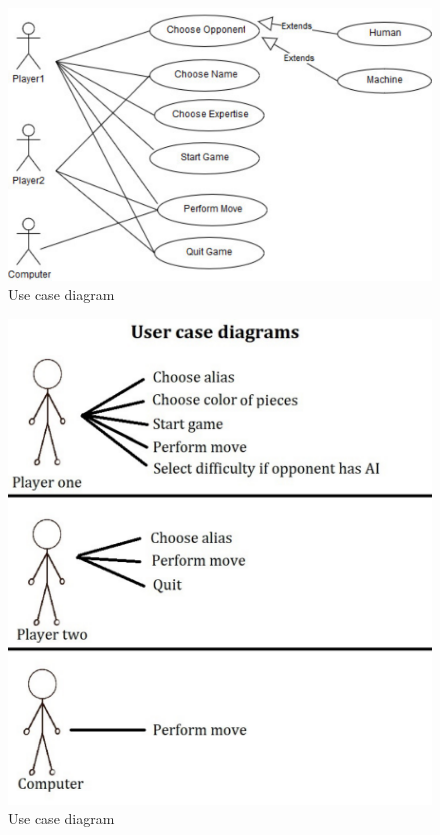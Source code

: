 \documentclass{article}
\begin{document}
\begin{figure}[h]
		\includegraphics*[scale=0.8]{User_case_diagram_1}
	\caption{Use case diagram }
	
\end{figure}

\begin{figure}[h]
		\includegraphics*[scale=0.8]{User_case_diagram_2}
	\caption{Use case diagram }
	
\end{figure}
\end{document}
